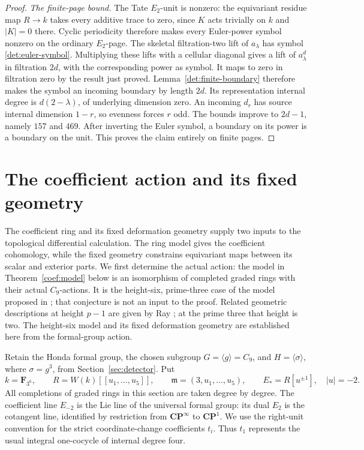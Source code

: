 \documentclass[11pt]{article}
\theoremstyle{definition}
\theoremstyle{remark}
\numberwithin{equation}{section}
\begin{document}
\begin{proof}
\emph{The finite-page bound.}
The Tate \(E_2\)-unit is nonzero: the equivariant residue map
\(R\to k\) takes every additive trace to zero, since \(K\)
acts trivially on \(k\) and \(|K|=0\) there.  Cyclic
periodicity therefore makes every Euler-power symbol nonzero
on the ordinary \(E_2\)-page.
The skeletal filtration-two lift of \(a_\lambda\) has
symbol \eqref{det:euler-symbol}.
Multiplying these lifts with a cellular diagonal gives
a lift of \(a_\lambda^d\) in filtration \(2d\), with the
corresponding power as symbol.
It maps to zero in filtration zero by the result just proved.
Lemma~\ref{det:finite-boundary} therefore makes the symbol
an incoming boundary by length \(2d\).
Its representation internal degree is \(d(2-\lambda)\),
of underlying dimension zero.
An incoming \(d_r\) has source internal dimension \(1-r\),
so evenness forces \(r\) odd.
The bounds improve to \(2d-1\), namely \(157\) and \(469\).
After inverting the Euler symbol, a boundary on its power
is a boundary on the unit.  This proves the claim entirely
on finite pages.
\end{proof}

\section{The coefficient action and its fixed geometry}
\label{sec:coefficients}

The coefficient ring and its fixed deformation geometry supply two
inputs to the topological differential calculation.  The ring model
gives the coefficient cohomology, while the fixed geometry constrains
equivariant maps between its scalar and exterior parts.
We first determine the actual action: the model in
Theorem~\ref{coef:model} below is an isomorphism of completed graded rings
with their actual \(C_9\)-actions.  It is the height-six, prime-three case
of the model proposed in \cite[Conjecture~0.3]{BR}; that conjecture is not
an input to the proof.
Related geometric descriptions at height \(p-1\) are given by
Ray \cite[Theorem~C and Section~10.5]{Ray}; at the prime three
that height is two.  The height-six model and its fixed deformation
geometry are established here from the formal-group action.

Retain the Honda formal group, the chosen subgroup
\(G=\langle g\rangle=C_9\), and \(H=\langle\sigma\rangle\), where
\(\sigma=g^3\), from Section~\ref{sec:detector}.  Put
\[
 k=\mathbf F_{3^6},\qquad
 R=W(k)[[u_1,\ldots,u_5]],\qquad
 \mathfrak m=(3,u_1,\ldots,u_5),\qquad E_*=R[u^{\pm1}],
 \quad |u|=-2.
\]
All completions of graded rings in this section are taken degree by
degree.  The coefficient line \(E_{-2}\) is the Lie line of the universal
formal group: its dual \(E_2\) is the cotangent line, identified by
restriction from \(\mathbf{CP}^{\infty}\) to \(\mathbf{CP}^1\).
We use the right-unit convention for the strict coordinate-change
coefficients \(t_i\).  Thus \(t_1\) represents the usual integral
one-cocycle of internal degree four.
\end{document}
